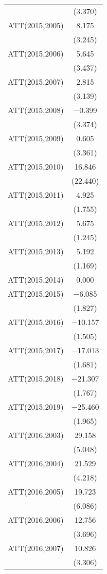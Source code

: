 \begin{table}
\begin{tabular}[t]{lc}
 & (\num{3.370})\\
ATT(2015,2005) & \num{8.175}\\
 & (\num{3.245})\\
ATT(2015,2006) & \num{5.645}\\
 & (\num{3.437})\\
ATT(2015,2007) & \num{2.815}\\
 & (\num{3.139})\\
ATT(2015,2008) & \num{-0.399}\\
 & (\num{3.374})\\
ATT(2015,2009) & \num{0.605}\\
 & (\num{3.361})\\
ATT(2015,2010) & \num{16.846}\\
 & (\num{22.440})\\
ATT(2015,2011) & \num{4.925}\\
 & (\num{1.755})\\
ATT(2015,2012) & \num{5.675}\\
 & (\num{1.245})\\
ATT(2015,2013) & \num{5.192}\\
 & (\num{1.169})\\
ATT(2015,2014) & \num{0.000}\\
ATT(2015,2015) & \num{-6.085}\\
 & (\num{1.827})\\
ATT(2015,2016) & \num{-10.157}\\
 & (\num{1.505})\\
ATT(2015,2017) & \num{-17.013}\\
 & (\num{1.681})\\
ATT(2015,2018) & \num{-21.307}\\
 & (\num{1.767})\\
ATT(2015,2019) & \num{-25.460}\\
 & (\num{1.965})\\
ATT(2016,2003) & \num{29.158}\\
 & (\num{5.048})\\
ATT(2016,2004) & \num{21.529}\\
 & (\num{4.218})\\
ATT(2016,2005) & \num{19.723}\\
 & (\num{6.086})\\
ATT(2016,2006) & \num{12.756}\\
 & (\num{3.696})\\
ATT(2016,2007) & \num{10.826}\\
 & (\num{3.306})\\

\end{tabular}
\end{table}
